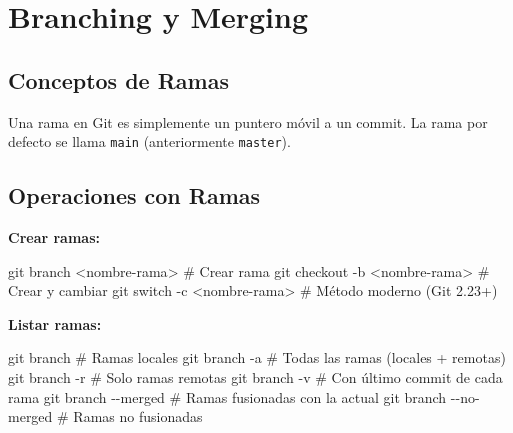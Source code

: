 \documentclass[
  doc,
  floatsintext,
  longtable,
  a4paper,
  nolmodern,
  notxfonts,
  notimes,
  12pt,
  colorlinks=true,linkcolor=blue,citecolor=blue,urlcolor=blue]{apa7}
\newenvironment{Shaded}{\begin{snugshade}}{\end{snugshade}}
\newcommand{\AttributeTok}[1]{\textcolor[rgb]{0.40,0.45,0.13}{#1}}
\newcommand{\CommentTok}[1]{\textcolor[rgb]{0.37,0.37,0.37}{#1}}
\newcommand{\FunctionTok}[1]{\textcolor[rgb]{0.28,0.35,0.67}{#1}}
\newcommand{\NormalTok}[1]{\textcolor[rgb]{0.00,0.23,0.31}{#1}}
\newcommand{\OperatorTok}[1]{\textcolor[rgb]{0.37,0.37,0.37}{#1}}
\begin{document}
\section{Branching y Merging}\label{branching-y-merging}

\subsection{Conceptos de Ramas}\label{conceptos-de-ramas}

Una rama en Git es simplemente un puntero móvil a un commit. La rama por
defecto se llama \texttt{main} (anteriormente \texttt{master}).

\subsection{Operaciones con Ramas}\label{operaciones-con-ramas}

\textbf{Crear ramas:}

\begin{Shaded}
\begin{Highlighting}[]
\FunctionTok{git}\NormalTok{ branch }\OperatorTok{\textless{}}\NormalTok{nombre{-}rama}\OperatorTok{\textgreater{}}   \CommentTok{\# Crear rama}
\FunctionTok{git}\NormalTok{ checkout }\AttributeTok{{-}b} \OperatorTok{\textless{}}\NormalTok{nombre{-}rama}\OperatorTok{\textgreater{}}  \CommentTok{\# Crear y cambiar}
\FunctionTok{git}\NormalTok{ switch }\AttributeTok{{-}c} \OperatorTok{\textless{}}\NormalTok{nombre{-}rama}\OperatorTok{\textgreater{}}    \CommentTok{\# Método moderno (Git 2.23+)}
\end{Highlighting}
\end{Shaded}

\textbf{Listar ramas:}

\begin{Shaded}
\begin{Highlighting}[]
\FunctionTok{git}\NormalTok{ branch                 }\CommentTok{\# Ramas locales}
\FunctionTok{git}\NormalTok{ branch }\AttributeTok{{-}a}              \CommentTok{\# Todas las ramas (locales + remotas)}
\FunctionTok{git}\NormalTok{ branch }\AttributeTok{{-}r}              \CommentTok{\# Solo ramas remotas}
\FunctionTok{git}\NormalTok{ branch }\AttributeTok{{-}v}              \CommentTok{\# Con último commit de cada rama}
\FunctionTok{git}\NormalTok{ branch }\AttributeTok{{-}{-}merged}        \CommentTok{\# Ramas fusionadas con la actual}
\FunctionTok{git}\NormalTok{ branch }\AttributeTok{{-}{-}no{-}merged}     \CommentTok{\# Ramas no fusionadas}
\end{Highlighting}
\end{Shaded}
\end{document}
